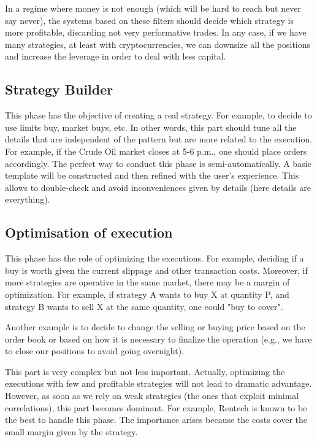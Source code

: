 \documentclass{article}[10pt]
\begin{document}
 In a regime where money is not enough (which will be hard to reach but never say never), the systems based on these filters should decide which strategy is more profitable, discarding not very performative trades. In any case, if we have many strategies, at least with cryptocurrencies, we can downsize all the positions and increase the leverage in order to deal with less capital.
 
  
 

 \subsection{Strategy Builder}
 This phase has the objective of creating a real strategy. For example, to decide to use limits buy, market buys, etc.
 In other words, this part should tune all the details that are independent of the pattern but are more related to the execution. For example, if the Crude Oil market closes at 5-6 p.m., one should place orders accordingly. 
 The perfect way to conduct this phase is semi-automatically. A basic template will be constructed and then refined with the user's experience. This allows to double-check and avoid inconveniences given by details (here details are everything).
 
 \subsection{Optimisation of execution}
 This phase has the role of optimizing the executions. 
 For example, deciding if a buy is worth given the current slippage and other transaction costs. Moreover, if more strategies are operative in the same market, there may be a margin of optimization. For example, if strategy A wants to buy X at quantity P, and strategy B wants to sell X at the same quantity, one could "buy to cover".
 
Another example is to decide to change the selling or buying price based on the order book or based on how it is necessary to finalize the operation (e.g., we have to close our positions to avoid going overnight).

This part is very complex but not less important. Actually, optimizing the executions with few and profitable strategies will not lead to dramatic advantage. However, as soon as we rely on weak strategies (the ones that exploit minimal correlations), this part becomes dominant. For example, Rentech is known to be the best to handle this phase. The importance arises because the costs cover the small margin given by the strategy. 
  
\end{document}
